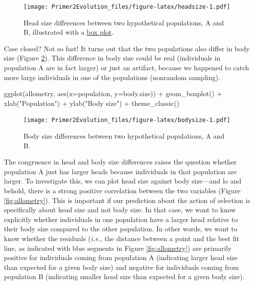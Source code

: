 \documentclass[
]{book}
\newenvironment{Shaded}{\begin{snugshade}}{\end{snugshade}}
\newcommand{\AttributeTok}[1]{\textcolor[rgb]{0.77,0.63,0.00}{#1}}
\newcommand{\FunctionTok}[1]{\textcolor[rgb]{0.00,0.00,0.00}{#1}}
\newcommand{\NormalTok}[1]{#1}
\newcommand{\SpecialCharTok}[1]{\textcolor[rgb]{0.00,0.00,0.00}{#1}}
\newcommand{\StringTok}[1]{\textcolor[rgb]{0.31,0.60,0.02}{#1}}
\begin{document}
\begin{figure}
\centering
\texttt{[image: Primer2Evolution\_files/figure-latex/headsize-1.pdf]}
\caption{\label{fig:headsize}Head size differences between two hypothetical populations, A and B, illustrated with a \href{graph-library.html\#box-plot}{box plot}.}
\end{figure}

Case closed? Not so fast! It turns out that the two populations also differ in body size (Figure \ref{fig:bodysize}). This difference in body size could be real (individuals in population A are in fact larger) or just an artifact, because we happened to catch more large individuals in one of the populations (nonrandom sampling).

\begin{Shaded}
\begin{Highlighting}[]
\FunctionTok{ggplot}\NormalTok{(allometry, }\FunctionTok{aes}\NormalTok{(}\AttributeTok{x=}\NormalTok{population, }\AttributeTok{y=}\NormalTok{body.size)) }\SpecialCharTok{+}
    \FunctionTok{geom\_boxplot}\NormalTok{() }\SpecialCharTok{+}
    \FunctionTok{xlab}\NormalTok{(}\StringTok{"Population"}\NormalTok{) }\SpecialCharTok{+}
    \FunctionTok{ylab}\NormalTok{(}\StringTok{"Body size"}\NormalTok{) }\SpecialCharTok{+}
    \FunctionTok{theme\_classic}\NormalTok{()}
\end{Highlighting}
\end{Shaded}

\begin{figure}
\centering
\texttt{[image: Primer2Evolution\_files/figure-latex/bodysize-1.pdf]}
\caption{\label{fig:bodysize}Body size differences between two hypothetical populations, A and B.}
\end{figure}

The congruence in head and body size differences raises the question whether population A just has larger heads because individuals in that population are larger. To investigate this, we can plot head size against body size---and lo and behold, there is a strong positive correlation between the two variables (Figure \ref{fig:allometry}). This is important if our prediction about the action of selection is specifically about head size and not body size. In that case, we want to know explicitly whether individuals in one population have a larger head relative to their body size compared to the other population. In other words, we want to know whether the residuals (\emph{i.e.}, the distance between a point and the best fit line, as indicated with blue segments in Figure \ref{fig:allometry}) are primarily positive for individuals coming from population A (indicating larger head size than expected for a given body size) and negative for individuals coming from population B (indicating smaller head size than expected for a given body size).
\end{document}
